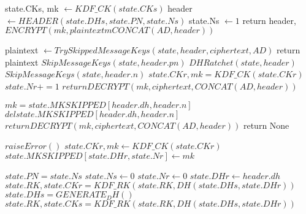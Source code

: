 \documentclass{article}
\begin{document}
    \begin{algorithm}
    \begin{algorithmic}
    
    	\State state.CKs, mk $\gets KDF\_CK(state.CKs)$
	\State header $\gets HEADER(state.DHs, state.PN, state.Ns)$
	\State state.Ns $\gets 1$
	\State return header, $ENCRYPT(mk, plaintextm CONCAT(AD, header))$
    \EndProcedure

		\State plaintext $\gets TrySkippedMessageKeys(state, header, ciphertext, AD)$
			\State return plaintext
		\EndIf
			\State $SkipMessageKeys(state, header.pn)$
			\State $DHRatchet(state, header)$
		\EndIf
		\State $SkipMessageKeys(state, header.n)$
		\State $state.CKr, mk = KDF\_CK(state.CKr)$
		\State $state.Nr += 1$
		\State $return DECRYPT(mk, ciphertext, CONCAT(AD, header))$
	\EndProcedure
	
		\State $mk = state.MKSKIPPED[header.dh, header.n]$
		\State $del state.MKSKIPPED[header.dh, header.n]$
		\State $return DECRYPT(mk, ciphertext, CONCAT(AD, header))$
	\Else
		\State return None
	\EndIf
	\EndProcedure
	
		\State $raise Error()$
	\EndIf
			\State $state.CKr, mk \gets KDF\_CK(state.CKr)$
			\State $state.MKSKIPPED[state.DHr, state.Nr] \gets mk$
		\EndWhile
	\EndIf
	\EndProcedure
	
		\State $state.PN = state.Ns$
		\State $state.Ns \gets 0$
		\State $state.Nr \gets 0$
		\State $state.DHr \gets header.dh$
		\State $state.RK, state.CKr = KDF\_RK(state.RK, DH(state.DHs, state.DHr))$
		\State $state.DHs = GENERATE_DH()$
		\State $state.RK, state.CKs = KDF\_RK(state.RK, DH(state.DHs, state.DHr))$
	\EndProcedure
	\end{algorithmic}
    \end{algorithm}
    
	
	    
\end{document}
